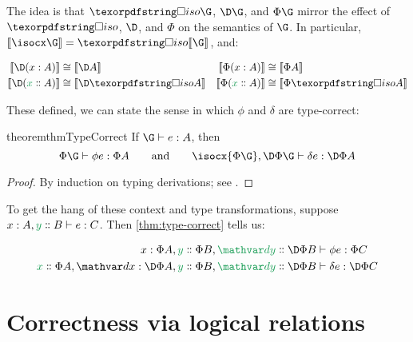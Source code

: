 \noindent
The idea is that $\isof\G$, $\D\G$, and $\Phi\G$ mirror the effect of $\iso$,
$\D$, and $\Phi$ on the semantics of $\G$. In particular, $\den{\isocx\G} =
\isof{\den\G}$, and:

\nopagebreak[2]
\begin{align*}
  \den{\D(\h x A)} &\cong \den{\D A}
  &
  \den{\Phi(\h x A)} &\cong \den{\Phi A}
  \\
  \den{\D(\hd x A)} &\cong \den{\D \isof A}
  &
  \den{\Phi(\hd x A)} &\cong \den{\Phi \isof A}
\end{align*}

\noindent
These defined, we can state the sense in which $\phi$ and $\delta$ are
type-correct:

\begin{restatable}{theorem}{thmTypeCorrect}
  \label{thm:type-correct}
  If $\J e \G A$, then
  \[ \J {\phi e} {\Phi\G} {\Phi A}
  \qquad\text{and}\qquad
  \J {\delta e} {\isocx{\Phi\G}, \DP\G} {\DP A}
  \]
\end{restatable}
\begin{proof}
  By induction on typing derivations; see \XXX. %
\end{proof}

\noindent To get the hang of these context and type transformations, suppose $\J
e {\h x A, \hd y B} C$. Then \cref{thm:type-correct} tells us:

\nopagebreak[2]
\begin{align*}
  \Jalign {\phi e} {\h x {\Phi A}, \hd y {\Phi B}, \hd \dy {\DP B}} {\Phi C}
  \\
  \Jalign {\delta e} {\hd x {\Phi A}, \h\dx{\DP A}, \hd y {\Phi B}, \hd \dy {\DP B}} {\DP C}
\end{align*}


\section{Correctness via logical relations}
\label{sec:logical-relations}

